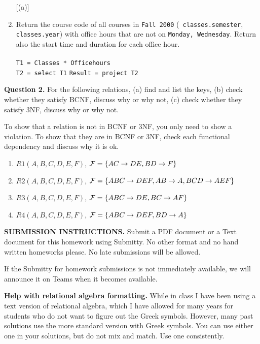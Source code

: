 \documentclass[11pt]{article}
\begin{document}
\begin{enumerate}  [(a)]
\item Return the course code of all courses in {\tt Fall 2000} ({\tt
  classes.semester}, {\tt classes.year}) with office hours that are
  not on {\tt Monday, Wednesday}. Return also the start time and duration
  for each office hour. \\\\
\texttt{T1 = Classes * Officehours} \\
\texttt{T2 = select T1}
\texttt{Result = project T2} \\
\end{enumerate}

{\bf Question 2.} For the following relations, (a) find and list the
keys, (b) check whether they satisfy BCNF, discuss why or why not, (c)
check whether they satisfy 3NF, discuss why or why not.

To show that a relation is not in BCNF or 3NF, you only need to show a
violation. To show that they are in BCNF or 3NF, check each functional
dependency and discuss why it is ok.

\begin{enumerate}

\item $R1(A,B,C,D,E,F)$, ${\cal F} = \{AC\rightarrow DE, BD\rightarrow F \}$

\item $R2(A,B,C,D,E,F)$, ${\cal F} = \{ABC\rightarrow DEF,
  AB\rightarrow A, BCD\rightarrow AEF \}$

\item $R3(A,B,C,D,E,F)$, ${\cal F} = \{ABC\rightarrow DE, BC\rightarrow AF \}$

\item $R4(A,B,C,D,E,F)$, ${\cal F} = \{ABC\rightarrow DEF, BD\rightarrow A \}$
  
\end{enumerate}


{\bf SUBMISSION INSTRUCTIONS.} Submit a PDF document or a Text
document for this homework using Submitty. No other format and no hand
written homeworks please. No late submissions will be allowed.

If the Submitty for homework submissions is not immediately available,
we will announce it on Teams when it becomes available.

{\bf Help with relational algebra formatting.} While in class I have
been using a text version of relational algebra, which I have allowed
for many years for students who do not want to figure out the Greek
symbols. However, many past solutions use the more standard version
with Greek symbols. You can use either one in your solutions, but do
not mix and match. Use one consistently.
\end{document}

